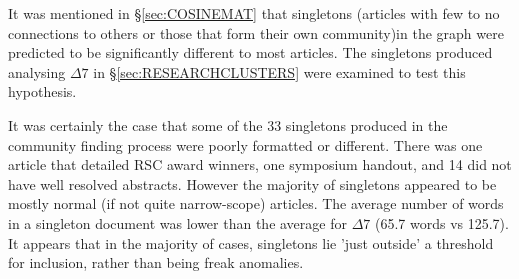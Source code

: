 \label{sec:singletons}
It was mentioned in \S\ref{sec:COSINEMAT} that singletons (articles with few to no connections to others or those that form their own community)in the graph were predicted to be significantly different to most articles. The singletons produced analysing $\Delta7$ in \S\ref{sec:RESEARCHCLUSTERS} were examined to test this hypothesis.

It was certainly the case that some of the 33 singletons produced in the community finding process were poorly formatted or different. There was one article that detailed RSC award winners, one symposium handout, and 14 did not have well resolved abstracts. However the majority of singletons appeared to be mostly normal (if not quite narrow-scope) articles. The average number of words in a singleton document was lower than the average for $\Delta7$ (65.7 words vs 125.7). It appears that in the majority of cases, singletons lie 'just outside' a threshold for inclusion, rather than being freak anomalies.
